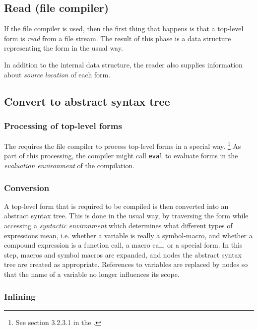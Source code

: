 \subsection{Read (file compiler)}

If the file compiler is used, then the first thing that happens is
that a top-level form is \emph{read} from a file stream.  The result
of this phase is a data structure representing the form in the usual
way. 

In addition to the internal data structure, the reader also supplies
information about \emph{source location} of each form.  

\subsection{Convert to abstract syntax tree}

\subsubsection{Processing of top-level forms}

The \hs{} requires the file compiler to process top-level forms in a
special way.%
\footnote{See section 3.2.3.1 in the \hs{}.}
As part of this processing, the compiler might call \texttt{eval} to
evaluate forms in the \emph{evaluation environment} of the
compilation. 

\subsubsection{Conversion}

A top-level form that is required to be compiled is then converted
into an abstract syntax tree.  This is done in the usual way, by
traversing the form while accessing a \emph{syntactic environment}
which determines what different types of expressions mean,
i.e. whether a variable is really a symbol-macro, and whether a
compound expression is a function call, a macro call, or a special
form.  In this step, macros and symbol macros are expanded, and nodes
the abstract syntax tree are created as
appropriate.  References to
variables are replaced by nodes so that the name of a variable no
longer influences its scope.

\subsubsection{Inlining}

